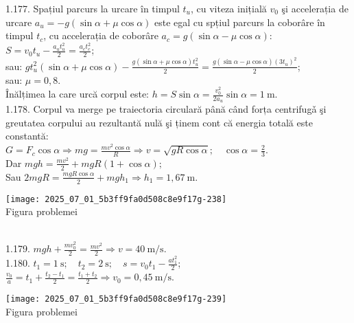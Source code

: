1.177. Spațiul parcurs la urcare în timpul $t_{u}$, cu viteza inițială $v_{0}$ şi accelerația de urcare $a_{u}=-g(\sin \alpha+\mu \cos \alpha)$ este egal cu spțiul parcurs la coborâre în timpul $t_{c}$, cu accelerația de coborâre $a_{c}=g(\sin \alpha-\mu \cos \alpha)$:\\ $S=v_{0} t_{u}-\frac{a_{u} t_{u}^{2}}{2}=\frac{a_{c} t_{c}^{2}}{2}$;\\ sau: $g t_{u}^{2}(\sin \alpha+\mu \cos \alpha)-\frac{g(\sin \alpha+\mu \cos \alpha) t_{u}^{2}}{2}=\frac{g(\sin \alpha-\mu \cos \alpha)\left(3 t_{u}\right)^{2}}{2}$;\\ sau: $\mu=0,8$.\\ Înălțimea la care urcă corpul este: $h=S \sin \alpha=\frac{v_{0}^{2}}{2 a_{u}} \sin \alpha=1 \mathrm{~m}$.\\

1.178. Corpul va merge pe traiectoria circulară până când forța centrifugǎ şi greutatea corpului au rezultantă nulă şi ținem cont că energia totală este constantă:\\ $G=F_{c} \cos \alpha \Rightarrow m g=\frac{m v^{2} \cos \alpha}{R} \Rightarrow v=\sqrt{g R \cos \alpha}; \quad \cos \alpha=\frac{2}{3}$.\\ Dar $m g h=\frac{m v^{2}}{2}+m g R(1+\cos \alpha);$\\ Sau $2 m g R=\frac{m g R \cos \alpha}{2}+m g h_{1} \Rightarrow h_{1}=1,67 \mathrm{~m}$.\\ \begin{center} \texttt{[image: 2025\_07\_01\_5b3ff9fa0d508c8e9f17g-238]}\\ Figura problemei \end{center}\\

1.179. $m g h+\frac{m v_{0}^{2}}{2}=\frac{m v^{2}}{2} \Rightarrow v=40 \mathrm{~m} / \mathrm{s}$.\\

1.180. $t_{1}=1 \mathrm{~s}; \quad t_{2}=2 \mathrm{~s}; \quad s=v_{0} t_{1}-\frac{a t_{1}^{2}}{2}$;\\ $\frac{v_{0}}{a}=t_{1}+\frac{t_{2}-t_{1}}{2}=\frac{t_{1}+t_{2}}{2} \Rightarrow v_{0}=0,45 \mathrm{~m} / \mathrm{s}$.\\ \begin{center} \texttt{[image: 2025\_07\_01\_5b3ff9fa0d508c8e9f17g-239]}\\ Figura problemei \end{center}\\

